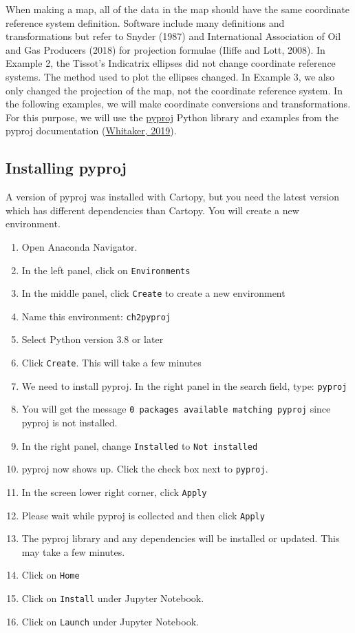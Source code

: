 \documentclass[a4paper , 12pt]{book}
\newcommand{\code}[1]{\colorbox{light-gray}{\texttt{#1}}}
\begin{document}
When making a map, all of the data in the map should have the same coordinate reference system definition. Software include many definitions and transformations but refer to Snyder (1987) and International Association of Oil and Gas Producers (2018) for projection formulae (Iliffe and Lott, 2008). In Example 2, the Tissot’s Indicatrix ellipses did not change coordinate reference systems. The method used to plot the ellipses changed. In Example 3, we also only changed the projection of the map, not the coordinate reference system. In the following examples, we will make coordinate conversions and transformations. For this purpose, we will use the \href{https://pypi.org/project/pyproj/}{pyproj} Python library and examples from the pyproj documentation (\href{https://pyproj4.github.io/pyproj/stable/api/transformer.html?highlight=transformer}{Whitaker, 2019}).

\subsection*{Installing pyproj}

A version of pyproj was installed with Cartopy, but you need the latest version which has different dependencies than Cartopy. You will create a new environment.

\begin{enumerate}
    \item Open Anaconda Navigator.
    \item In the left panel, click on \code{Environments}
    \item In the middle panel, click \code{Create} to create a new environment
    \item Name this environment: \code{ch2pyproj}
    \item Select Python version 3.8 or later
    \item Click \code{Create}. This will take a few minutes
    \item We need to install pyproj. In the right panel in the search field, type: \code{pyproj}
    \item You will get the message \code{0 packages available matching pyproj} since pyproj is not installed. 
    \item In the right panel, change \code{Installed} to \code{Not installed}
    \item pyproj now shows up. Click the check box next to \code{pyproj}.
    \item In the screen lower right corner, click \code{Apply}
    \item Please wait while pyproj is collected and then click \code{Apply}
    \item The pyproj library and any dependencies will be installed or updated. This may take a few minutes.
    \item Click on \code{Home}
    \item Click on \code{Install} under Jupyter Notebook.
    \item Click on \code{Launch} under Jupyter Notebook.
\end{enumerate}
\end{document}
